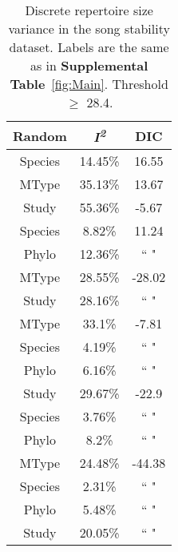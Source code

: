 \documentclass{article}
\begin{document}
  \begin{table}[H]
  \centering
  \caption{Discrete repertoire size variance in the song stability dataset. Labels are the same as in \textbf{Supplemental Table}~\ref{fig:Main}. Threshold $\ge$ 28.4.} 
  \begin{tabular}{ccc}
  \hline
  Random & \textit{I\textsuperscript{2}} & DIC \\ 
  \hline
  Species & 14.45\% & 16.55 \\ \hdashline
  MType & 35.13\% & 13.67 \\ \hdashline
  Study & 55.36\% & -5.67 \\ \hdashline
  Species & 8.82\% & 11.24 \\ 
  Phylo & 12.36\% & `` " \\ \hdashline
  MType & 28.55\% & -28.02 \\ 
  Study & 28.16\% & `` " \\ \hdashline
  MType & 33.1\% & -7.81 \\ 
  Species & 4.19\% & `` " \\ 
  Phylo & 6.16\% & `` " \\ \hdashline
  Study & 29.67\% & -22.9 \\ 
  Species & 3.76\% & `` " \\ 
  Phylo & 8.2\% & `` " \\ \hdashline
  MType & 24.48\% & -44.38 \\ 
  Species & 2.31\% & `` " \\ 
  Phylo & 5.48\% & `` " \\ 
  Study & 20.05\% & `` " \\ 
  \hline
  \end{tabular}
  \end{table}
\end{document}
